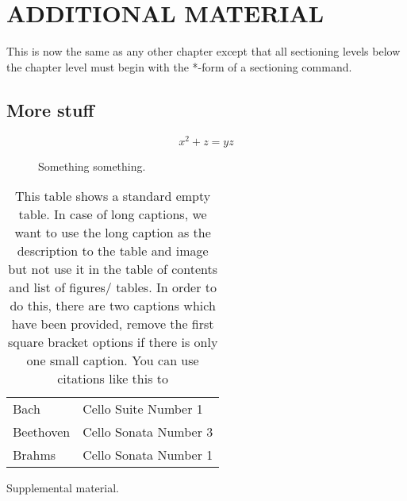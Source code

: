 

\unappendixtitle
\singleappendixtitle
{}

\chapter{ADDITIONAL MATERIAL} 


This is now the same as any other chapter except that
all sectioning levels below the chapter level must begin
with the *-form of a sectioning command.

\section*{More stuff}
\begin{equation}
    x^2+z=yz
\end{equation}
\begin{figure}
    \caption{Something something.}
\end{figure}
\begin{table}[h!tb] \centering
    \caption[This table shows a standard non-empty table. Please check the code caption for extended instructions]{This table shows a standard empty table. In case of long captions, we want to use the long caption as the description to the table and image but not use it in the table of contents and list of figures/ tables. In order to do this, there are two captions which have been provided, remove the first square bracket options if there is only one small caption. You can use citations like this to}
    \begin{tabular}{ll}
        Bach            &Cello Suite Number 1  \\
        Beethoven       &Cello Sonata Number 3 \\
        Brahms          &Cello Sonata Number 1
      \end{tabular}
\label{nothingagain}

\vspace{ 2 in}
\end{table}
Supplemental material.


